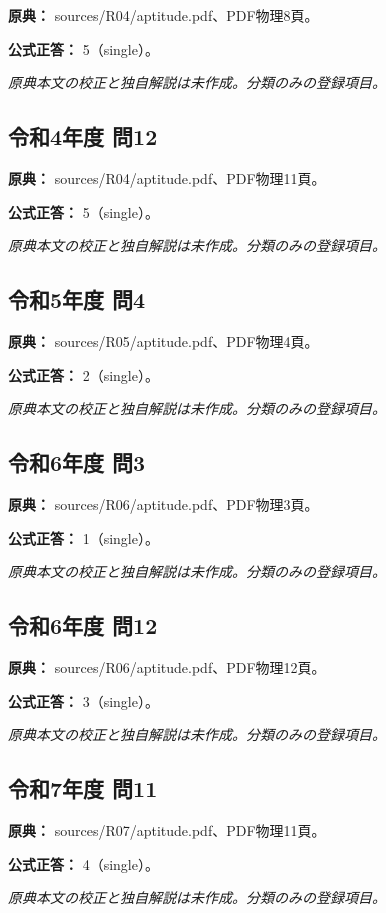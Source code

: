 \noindent\textbf{原典：} sources/R04/aptitude.pdf、PDF物理8頁。

\textbf{公式正答：} 5（single）。

\par\textit{原典本文の校正と独自解説は未作成。分類のみの登録項目。}

\subsection{令和4年度 問12}
\label{q:r04-reg-apt-12}

\noindent\textbf{原典：} sources/R04/aptitude.pdf、PDF物理11頁。

\textbf{公式正答：} 5（single）。

\par\textit{原典本文の校正と独自解説は未作成。分類のみの登録項目。}

\subsection{令和5年度 問4}
\label{q:r05-reg-apt-04}

\noindent\textbf{原典：} sources/R05/aptitude.pdf、PDF物理4頁。

\textbf{公式正答：} 2（single）。

\par\textit{原典本文の校正と独自解説は未作成。分類のみの登録項目。}

\subsection{令和6年度 問3}
\label{q:r06-reg-apt-03}

\noindent\textbf{原典：} sources/R06/aptitude.pdf、PDF物理3頁。

\textbf{公式正答：} 1（single）。

\par\textit{原典本文の校正と独自解説は未作成。分類のみの登録項目。}

\subsection{令和6年度 問12}
\label{q:r06-reg-apt-12}

\noindent\textbf{原典：} sources/R06/aptitude.pdf、PDF物理12頁。

\textbf{公式正答：} 3（single）。

\par\textit{原典本文の校正と独自解説は未作成。分類のみの登録項目。}

\subsection{令和7年度 問11}
\label{q:r07-reg-apt-11}

\noindent\textbf{原典：} sources/R07/aptitude.pdf、PDF物理11頁。

\textbf{公式正答：} 4（single）。

\par\textit{原典本文の校正と独自解説は未作成。分類のみの登録項目。}
